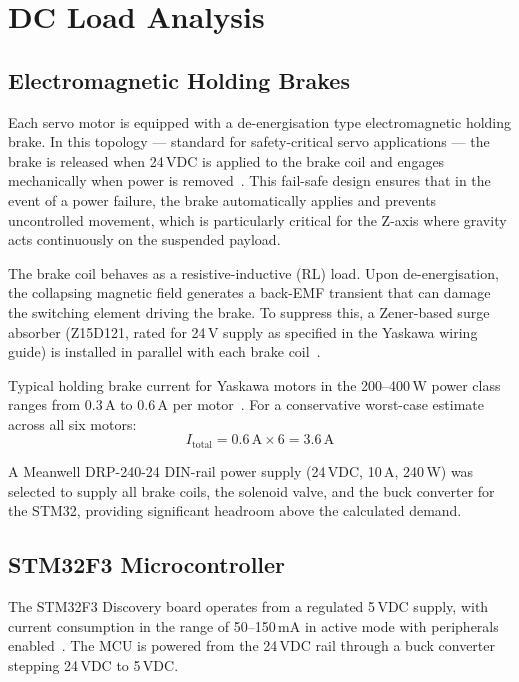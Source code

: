 \section{DC Load Analysis}

\subsection{Electromagnetic Holding Brakes}

Each servo motor is equipped with a de-energisation type electromagnetic holding brake. In this topology --- standard for safety-critical servo applications --- the brake is released when 24\,VDC is applied to the brake coil and engages mechanically when power is removed~\cite{yaskawa_manual}. This fail-safe design ensures that in the event of a power failure, the brake automatically applies and prevents uncontrolled movement, which is particularly critical for the Z-axis where gravity acts continuously on the suspended payload.

The brake coil behaves as a resistive-inductive (RL) load. Upon de-energisation, the collapsing magnetic field generates a back-EMF transient that can damage the switching element driving the brake. To suppress this, a Zener-based surge absorber (Z15D121, rated for 24\,V supply as specified in the Yaskawa wiring guide) is installed in parallel with each brake coil~\cite{yaskawa_manual}.

Typical holding brake current for Yaskawa motors in the 200--400\,W power class ranges from 0.3\,A to 0.6\,A per motor~\cite{yaskawa_catalog}. For a conservative worst-case estimate across all six motors:
\[
I_\text{total} = 0.6\,\text{A} \times 6 = 3.6\,\text{A}
\]

A Meanwell DRP-240-24 DIN-rail power supply (24\,VDC, 10\,A, 240\,W) was selected to supply all brake coils, the solenoid valve, and the buck converter for the STM32, providing significant headroom above the calculated demand.

\subsection{STM32F3 Microcontroller}

The STM32F3 Discovery board operates from a regulated 5\,VDC supply, with current consumption in the range of 50--150\,mA in active mode with peripherals enabled~\cite{stm32_manual}. The MCU is powered from the 24\,VDC rail through a buck converter stepping 24\,VDC to 5\,VDC.

